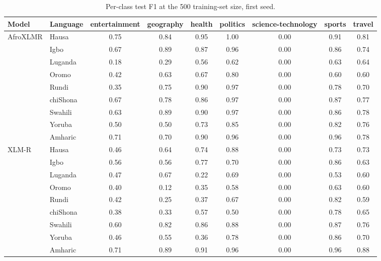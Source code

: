 \begin{table}[t]
\centering
\caption{Per-class test F1 at the 500 training-set size, first seed.}
\label{tab:per_class_f1}
\small
\begin{tabular}{llccccccc}
\toprule
Model & Language & entertainment & geography & health & politics & science-technology & sports & travel \\
\midrule
AfroXLMR & Hausa & 0.75 & 0.84 & 0.95 & 1.00 & 0.00 & 0.91 & 0.81 \\
 & Igbo & 0.67 & 0.89 & 0.87 & 0.96 & 0.00 & 0.86 & 0.74 \\
 & Luganda & 0.18 & 0.29 & 0.56 & 0.62 & 0.00 & 0.63 & 0.64 \\
 & Oromo & 0.42 & 0.63 & 0.67 & 0.80 & 0.00 & 0.60 & 0.60 \\
 & Rundi & 0.35 & 0.75 & 0.90 & 0.97 & 0.00 & 0.78 & 0.70 \\
 & chiShona & 0.67 & 0.78 & 0.86 & 0.97 & 0.00 & 0.87 & 0.77 \\
 & Swahili & 0.63 & 0.89 & 0.90 & 0.97 & 0.00 & 0.86 & 0.78 \\
 & Yoruba & 0.50 & 0.50 & 0.73 & 0.85 & 0.00 & 0.82 & 0.76 \\
 & Amharic & 0.71 & 0.70 & 0.90 & 0.96 & 0.00 & 0.96 & 0.78 \\
\midrule
XLM-R & Hausa & 0.46 & 0.64 & 0.74 & 0.88 & 0.00 & 0.73 & 0.73 \\
 & Igbo & 0.56 & 0.56 & 0.77 & 0.70 & 0.00 & 0.86 & 0.63 \\
 & Luganda & 0.47 & 0.67 & 0.22 & 0.69 & 0.00 & 0.53 & 0.60 \\
 & Oromo & 0.40 & 0.12 & 0.35 & 0.58 & 0.00 & 0.63 & 0.60 \\
 & Rundi & 0.42 & 0.25 & 0.37 & 0.67 & 0.00 & 0.82 & 0.59 \\
 & chiShona & 0.38 & 0.33 & 0.57 & 0.50 & 0.00 & 0.78 & 0.65 \\
 & Swahili & 0.60 & 0.82 & 0.86 & 0.88 & 0.00 & 0.87 & 0.76 \\
 & Yoruba & 0.46 & 0.55 & 0.36 & 0.78 & 0.00 & 0.86 & 0.70 \\
 & Amharic & 0.71 & 0.89 & 0.91 & 0.96 & 0.00 & 0.96 & 0.88 \\
\bottomrule
\end{tabular}
\end{table}